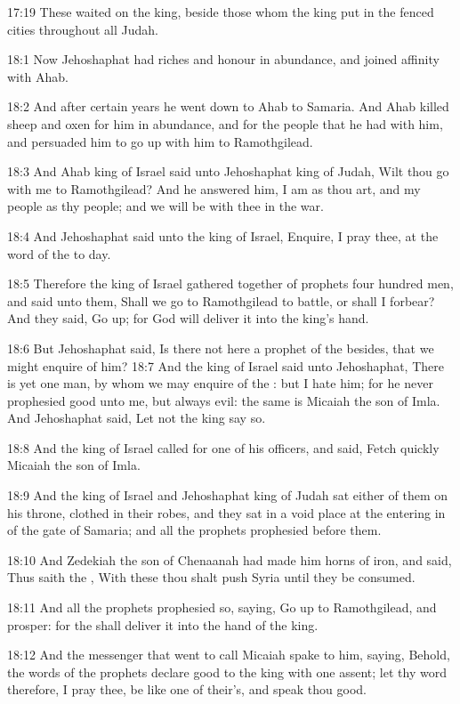 17:19 These waited on the king, beside those whom the king put in the fenced cities throughout all Judah.

18:1 Now Jehoshaphat had riches and honour in abundance, and joined affinity with Ahab.

18:2 And after certain years he went down to Ahab to Samaria. And Ahab killed sheep and oxen for him in abundance, and for the people that he had with him, and persuaded him to go up with him to Ramothgilead.

18:3 And Ahab king of Israel said unto Jehoshaphat king of Judah, Wilt thou go with me to Ramothgilead? And he answered him, I am as thou art, and my people as thy people; and we will be with thee in the war.

18:4 And Jehoshaphat said unto the king of Israel, Enquire, I pray thee, at the word of the \LORD to day.

18:5 Therefore the king of Israel gathered together of prophets four hundred men, and said unto them, Shall we go to Ramothgilead to battle, or shall I forbear? And they said, Go up; for God will deliver it into the king's hand.

18:6 But Jehoshaphat said, Is there not here a prophet of the \LORD besides, that we might enquire of him?  18:7 And the king of Israel said unto Jehoshaphat, There is yet one man, by whom we may enquire of the \LORD: but I hate him; for he never prophesied good unto me, but always evil: the same is Micaiah the son of Imla. And Jehoshaphat said, Let not the king say so.

18:8 And the king of Israel called for one of his officers, and said, Fetch quickly Micaiah the son of Imla.

18:9 And the king of Israel and Jehoshaphat king of Judah sat either of them on his throne, clothed in their robes, and they sat in a void place at the entering in of the gate of Samaria; and all the prophets prophesied before them.

18:10 And Zedekiah the son of Chenaanah had made him horns of iron, and said, Thus saith the \LORD, With these thou shalt push Syria until they be consumed.

18:11 And all the prophets prophesied so, saying, Go up to Ramothgilead, and prosper: for the \LORD shall deliver it into the hand of the king.

18:12 And the messenger that went to call Micaiah spake to him, saying, Behold, the words of the prophets declare good to the king with one assent; let thy word therefore, I pray thee, be like one of their's, and speak thou good.

